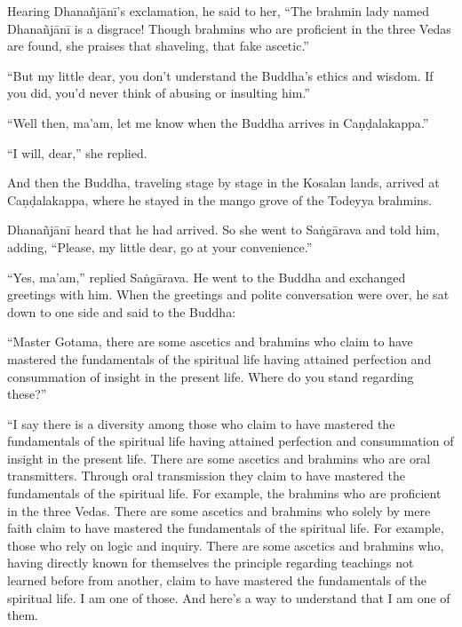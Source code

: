 \documentclass[12pt,openany]{book}%
\begin{document}
Hearing \textsanskrit{Dhanañjānī}’s exclamation, he said to her, “The brahmin lady named \textsanskrit{Dhanañjānī} is a disgrace! Though brahmins who are proficient in the three Vedas are found, she praises that shaveling, that fake ascetic.” 

“But my little dear, you don’t understand the Buddha’s ethics and wisdom. If you did, you’d never think of abusing or insulting him.” 

“Well then, ma’am, let me know when the Buddha arrives in \textsanskrit{Caṇḍalakappa}.” 

“I will, dear,” she replied. 

And then the Buddha, traveling stage by stage in the Kosalan lands, arrived at \textsanskrit{Caṇḍalakappa}, where he stayed in the mango grove of the Todeyya brahmins. 

\textsanskrit{Dhanañjānī} heard that he had arrived. So she went to \textsanskrit{Saṅgārava} and told him, adding, “Please, my little dear, go at your convenience.” 

“Yes, ma’am,” replied \textsanskrit{Saṅgārava}. He went to the Buddha and exchanged greetings with him. When the greetings and polite conversation were over, he sat down to one side and said to the Buddha: 

“Master Gotama, there are some ascetics and brahmins who claim to have mastered the fundamentals of the spiritual life having attained perfection and consummation of insight in the present life. Where do you stand regarding these?” 

“I say there is a diversity among those who claim to have mastered the fundamentals of the spiritual life having attained perfection and consummation of insight in the present life. There are some ascetics and brahmins who are oral transmitters. Through oral transmission they claim to have mastered the fundamentals of the spiritual life. For example, the brahmins who are proficient in the three Vedas. There are some ascetics and brahmins who solely by mere faith claim to have mastered the fundamentals of the spiritual life. For example, those who rely on logic and inquiry. There are some ascetics and brahmins who, having directly known for themselves the principle regarding teachings not learned before from another, claim to have mastered the fundamentals of the spiritual life. I am one of those. And here’s a way to understand that I am one of them. 
\end{document}
